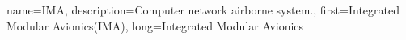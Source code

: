 {%
    name={IMA},
    description={Computer network airborne system.},
    first={Integrated Modular Avionics(IMA)},
    long={Integrated Modular Avionics}
}